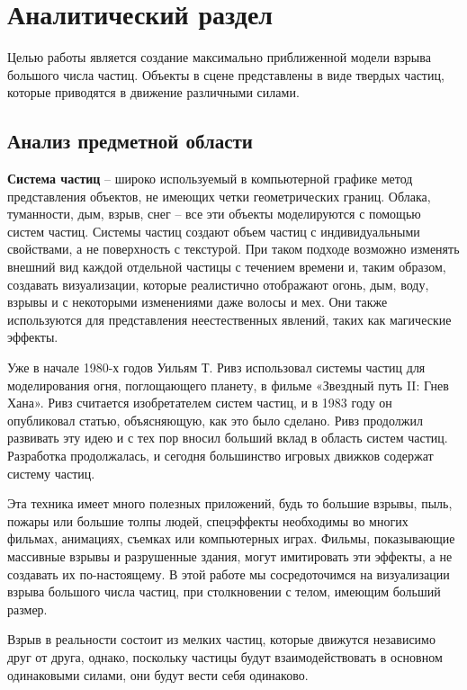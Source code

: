 \chapter{\textbf{Аналитический раздел}}
\hfill

Целью работы является создание максимально приближенной модели взрыва большого числа частиц. Объекты в сцене представлены в виде твердых частиц, которые приводятся в движение различными силами.  

\section{\textbf{Анализ предметной области }}

\textbf{Система частиц} – широко используемый в компьютерной графике метод представления объектов, не имеющих четки геометрических границ. Облака, туманности, дым, взрыв, снег – все эти объекты моделируются с помощью систем частиц. Системы частиц создают объем частиц с индивидуальными свойствами, а не поверхность с текстурой. При таком подходе возможно изменять внешний вид каждой отдельной частицы с течением времени и, таким образом, создавать визуализации, которые реалистично отображают огонь, дым, воду, взрывы и с некоторыми изменениями даже волосы и мех. Они также используются для представления неестественных явлений, таких как магические эффекты.  \cite{definition}

Уже в начале 1980-х годов Уильям Т. Ривз использовал системы частиц для моделирования огня, поглощающего планету, в фильме «Звездный путь II: Гнев Хана». Ривз считается изобретателем систем частиц, и в 1983 году он опубликовал статью, объясняющую, как это было сделано. Ривз продолжил развивать эту идею и с тех пор вносил больший вклад в область систем частиц. Разработка продолжалась, и сегодня большинство игровых движков содержат систему частиц. \cite{particlesystems}

Эта техника имеет много полезных приложений, будь то большие взрывы, пыль, пожары или большие толпы людей, спецэффекты необходимы во многих фильмах, анимациях, съемках или компьютерных играх. Фильмы, показывающие массивные взрывы и разрушенные здания, могут имитировать эти эффекты, а не создавать их по-настоящему. В этой работе мы сосредоточимся на визуализации взрыва большого числа частиц, при столкновении с телом, имеющим больший размер.
	
Взрыв в реальности состоит из мелких частиц, которые движутся независимо друг от друга, однако, поскольку частицы будут взаимодействовать в основном одинаковыми силами, они будут вести себя одинаково.
	
